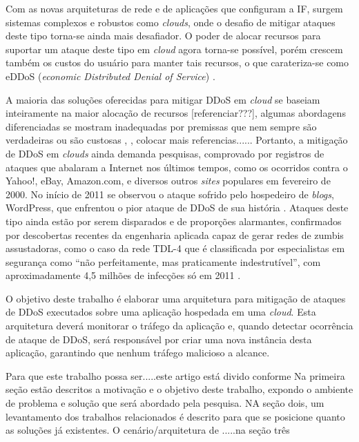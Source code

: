 \documentclass[a4paper, 12pt]{article}
\begin{document}
Com as novas arquiteturas de rede e de aplicações que configuram a IF, surgem sistemas complexos e robustos como \emph{clouds}, onde o desafio de mitigar ataques deste tipo torna-se ainda mais desafiador.  O poder de
alocar recursos para suportar um ataque deste tipo em \emph{cloud}  agora torna-se
possível, porém crescem também os custos do usuário para manter tais recursos, o que
carateriza-se como eDDoS (\emph{economic Distributed Denial of Service}) \cite{Soon:10}.
  
A maioria das soluções oferecidas para mitigar DDoS em \emph{cloud} se baseiam inteiramente na maior alocação de
recursos [referenciar???], algumas abordagens diferenciadas se mostram inadequadas por premissas que nem sempre são verdadeiras ou são custosas \cite{Bakshi:10}, \cite{Liu:2010:NFD:1866835.1866849},  colocar mais referencias...... 
Portanto, a mitigação de DDoS em \emph{clouds} ainda demanda pesquisas, comprovado por registros de ataques que abalaram a Internet nos últimos tempos, como os ocorridos contra o Yahoo!, eBay, Amazon.com, e diversos outros \emph{sites} populares em fevereiro de 2000.  No início de 2011 se observou o ataque sofrido pelo hospedeiro de \emph{blogs}, WordPress, que enfrentou o pior ataque de DDoS de sua história \cite{infoexame}. Ataques deste tipo ainda estão por serem disparados e de proporções alarmantes, confirmados por descobertas recentes da engenharia aplicada capaz de gerar redes de zumbis assustadoras, como o caso da rede TDL-4 que é classificada por especialistas em segurança como “não perfeitamente, mas praticamente indestrutível”, com aproximadamente 4,5 milhões de infecções só em 2011 \cite{tdl4}.

O objetivo deste trabalho é elaborar uma arquitetura para mitigação de ataques de
DDoS executados sobre uma aplicação hospedada em uma \emph{cloud}. Esta
arquitetura deverá monitorar o tráfego da aplicação e, quando
detectar ocorrência de ataque de DDoS, será responsável por criar uma nova
instância desta aplicação, garantindo que nenhum tráfego malicioso a alcance. 

Para que este trabalho possa ser.....este artigo está divido conforme 
Na primeira seção estão descritos a motivação e o objetivo deste trabalho, expondo o ambiente de problema e solução que será abordado pela pesquisa. NA seção dois, um levantamento dos trabalhos relacionados é descrito para que se posicione quanto as soluções já existentes. O cenário/arquitetura de .....na seção três

%
%
\end{document}
